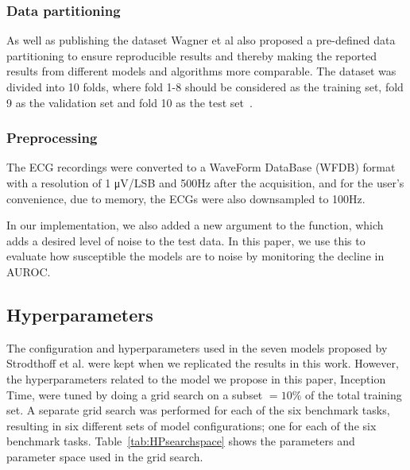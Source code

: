 \subsubsection{Data partitioning}
As well as publishing the dataset Wagner et al also proposed a pre-defined data partitioning to ensure reproducible results and thereby making the reported results from different models and algorithms more comparable. The dataset was divided into 10 folds, where fold 1-8 should be considered as the training set, fold 9 as the validation set and fold 10 as the test set~\cite{wagner_et_al_ptb-xl_2020}. 

\subsubsection{Preprocessing}
The ECG recordings were converted to a WaveForm DataBase (WFDB) format with a resolution of 1 μV/LSB and 500Hz after the acquisition, and for the user’s convenience, due to memory, the ECGs were also downsampled to 100Hz.

In our implementation, we also added a new argument to the function, which adds a desired level of noise to the test data. In this paper, we use this to evaluate how susceptible the models are to noise by monitoring the decline in AUROC.


\subsection{Hyperparameters}

The configuration and hyperparameters used in the seven models proposed by Strodthoff et al. were kept when we replicated the results in this work. However, the hyperparameters related to the model we propose in this paper, Inception Time, were tuned by doing a grid search on a subset $=10\%$ of the total training set. A separate grid search was performed for each of the six benchmark tasks, resulting in six different sets of model configurations; one for each of the six benchmark tasks. Table~\ref{tab:HPsearchspace} shows the parameters and parameter space used in the grid search.



